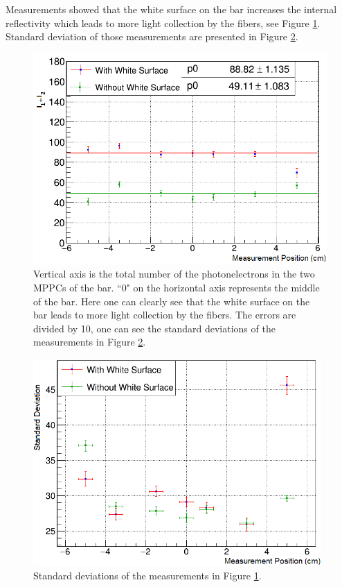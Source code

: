 \documentclass[a4paper]{article}\linespread{1.4}
\begin{document}
Measurements showed that the white surface on the bar increases the internal reflectivity which leads to more light collection by the fibers, see Figure \ref{fig:s0ps1}. Standard deviation of those measurements are presented in Figure \ref{fig:s0ps1e}.
\begin{figure}[] \centering \includegraphics[width=120mm,scale=1.0]{s0ps1.png} \caption{Vertical axis is the total number of the photonelectrons in the two MPPCs of the bar. ``0" on the horizontal axis represents the middle of the bar. Here one can clearly see that the white surface on the bar leads to more light collection by the fibers.  The errors are divided by 10, one can see the standard deviations of the measurements in Figure \ref{fig:s0ps1e}.} \label{fig:s0ps1} \end{figure}  
\begin{figure}[] \centering \includegraphics[width=110mm,scale=1.0]{s0ps1e.png} \caption{Standard deviations of the measurements in Figure \ref{fig:s0ps1}.}\label{fig:s0ps1e} \end{figure}  
\end{document}
